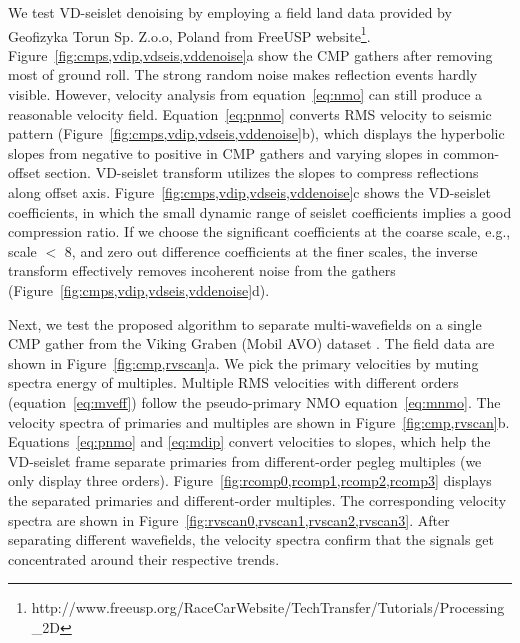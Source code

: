 We test VD-seislet denoising by employing a field land data provided
by Geofizyka Torun Sp. Z.o.o, Poland from FreeUSP
website\footnote{http://www.freeusp.org/RaceCarWebsite/TechTransfer/Tutorials/Processing\_2D}. Figure~\ref{fig:cmps,vdip,vdseis,vddenoise}a
show the CMP gathers after removing most of ground roll. The strong
random noise makes reflection events hardly visible. However, velocity
analysis from equation~\ref{eq:nmo} can still produce a reasonable
velocity field. Equation~\ref{eq:pnmo} converts RMS velocity to
seismic pattern (Figure~\ref{fig:cmps,vdip,vdseis,vddenoise}b), which
displays the hyperbolic slopes from negative to positive in CMP
gathers and varying slopes in common-offset
section. VD-seislet transform utilizes the slopes to compress
reflections along offset
axis. Figure~\ref{fig:cmps,vdip,vdseis,vddenoise}c shows the
VD-seislet coefficients, in which the small dynamic range of seislet
coefficients implies a good compression ratio.  If we choose the
significant coefficients at the coarse scale, e.g., scale $<$ 8, and
zero out difference coefficients at the finer scales, the inverse
transform effectively removes incoherent noise from the gathers
(Figure~\ref{fig:cmps,vdip,vdseis,vddenoise}d).


Next, we test the proposed algorithm to separate multi-wavefields on a
single CMP gather from the Viking Graben (Mobil AVO) dataset
\cite[]{key}. The field data are shown in
Figure~\ref{fig:cmp,rvscan}a. We pick the primary velocities by muting
spectra energy of multiples. Multiple RMS velocities with different
orders (equation~\ref{eq:mveff}) follow the pseudo-primary NMO
equation~\ref{eq:mnmo}. The velocity spectra of primaries and
multiples are shown in
Figure~\ref{fig:cmp,rvscan}b. Equations~\ref{eq:pnmo} and
\ref{eq:mdip} convert velocities to slopes, which help the VD-seislet frame
separate primaries from different-order pegleg multiples (we only
display three orders). Figure~\ref{fig:rcomp0,rcomp1,rcomp2,rcomp3}
displays the separated primaries and different-order multiples. The
corresponding velocity spectra are shown in
Figure~\ref{fig:rvscan0,rvscan1,rvscan2,rvscan3}. After separating
different wavefields, the velocity spectra confirm that the signals
get concentrated around their respective trends.

